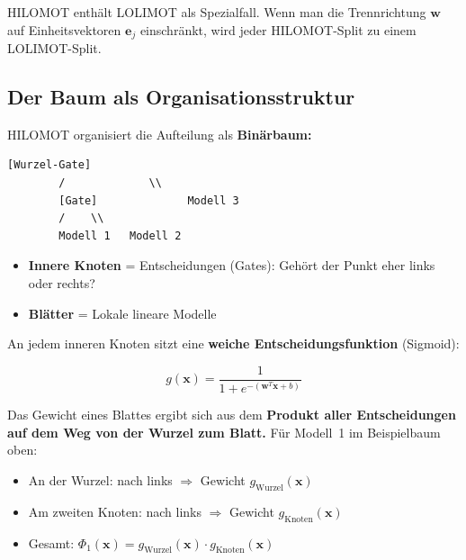 \documentclass[11pt,a4paper]{report}
\begin{document}
	\begin{merkbox}
		HILOMOT enthält LOLIMOT als Spezialfall. Wenn man die Trennrichtung $\mathbf{w}$ auf Einheitsvektoren $\mathbf{e}_j$ einschränkt, wird jeder HILOMOT-Split zu einem LOLIMOT-Split.
	\end{merkbox}
	
	\subsection{Der Baum als Organisationsstruktur}
	
	HILOMOT organisiert die Aufteilung als \textbf{Binärbaum:}
	
	\begin{lstlisting}[caption={Beispielbaum mit zwei Gate-Knoten und drei Blättern},language={}
		]
		[Wurzel-Gate]
		/             \\
		[Gate]              Modell 3
		/    \\
		Modell 1   Modell 2
	\end{lstlisting}
	
	\begin{itemize}
		\item \textbf{Innere Knoten} = Entscheidungen (Gates): \glqq Gehört der Punkt eher links oder rechts?\grqq{}
		\item \textbf{Blätter} = Lokale lineare Modelle
	\end{itemize}
	
	An jedem inneren Knoten sitzt eine \textbf{weiche Entscheidungsfunktion} (Sigmoid):
	
	\begin{equation}
		g(\mathbf{x}) = \frac{1}{1 + e^{-(\mathbf{w}^T \mathbf{x} + b)}}
	\end{equation}
	
	Das Gewicht eines Blattes ergibt sich aus dem \textbf{Produkt aller Entscheidungen auf dem Weg von der Wurzel zum Blatt.} Für Modell~1 im Beispielbaum oben:
	\begin{itemize}
		\item An der Wurzel: \glqq nach links\grqq{} $\Rightarrow$ Gewicht $g_{\mathrm{Wurzel}}(\mathbf{x})$
		\item Am zweiten Knoten: \glqq nach links\grqq{} $\Rightarrow$ Gewicht $g_{\mathrm{Knoten}}(\mathbf{x})$
		\item Gesamt: $\Phi_1(\mathbf{x}) = g_{\mathrm{Wurzel}}(\mathbf{x}) \cdot g_{\mathrm{Knoten}}(\mathbf{x})$
	\end{itemize}
	
\end{document}
